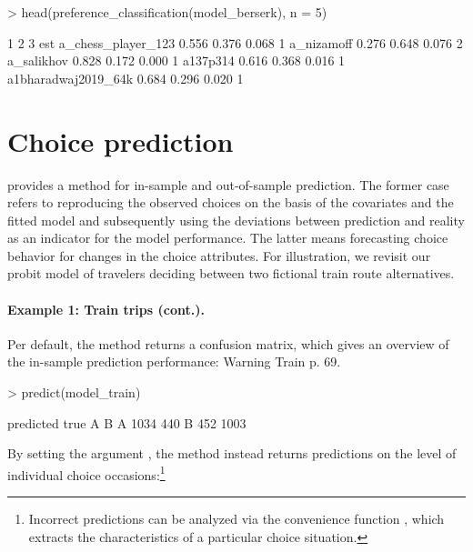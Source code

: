 \documentclass[article,shortnames]{jss}
\newcommand{\fct}[1]{\code{#1()}}
\begin{document}
\begin{Schunk}
\begin{Sinput}
> head(preference_classification(model_berserk), n = 5)
\end{Sinput}
\begin{Soutput}
                        1     2     3 est
a_chess_player_123  0.556 0.376 0.068   1
a_nizamoff          0.276 0.648 0.076   2
a_salikhov          0.828 0.172 0.000   1
a137p314            0.616 0.368 0.016   1
a1bharadwaj2019_64k 0.684 0.296 0.020   1
\end{Soutput}
\end{Schunk}

\section{Choice prediction} \label{sec:choice_prediction}

 provides a \fct{predict} method for in-sample and out-of-sample prediction. The former case refers to reproducing the observed choices on the basis of the covariates and the fitted model and subsequently using the deviations between prediction and reality as an indicator for the model performance. The latter means forecasting choice behavior for changes in the choice attributes. For illustration, we revisit our probit model of travelers deciding between two fictional train route alternatives.

\paragraph{Example 1: Train trips (cont.).}

Per default, the \fct{predict} method returns a confusion matrix, which gives an overview of the in-sample prediction performance: Warning Train p. 69.

\begin{Schunk}
\begin{Sinput}
> predict(model_train)
\end{Sinput}
\begin{Soutput}
    predicted
true    A    B
   A 1034  440
   B  452 1003
\end{Soutput}
\end{Schunk}

By setting the argument , the method instead returns predictions on the level of individual choice occasions:\footnote{Incorrect predictions can be analyzed via the convenience function \fct{get\_cov}, which extracts the characteristics of a particular choice situation.}
\end{document}
